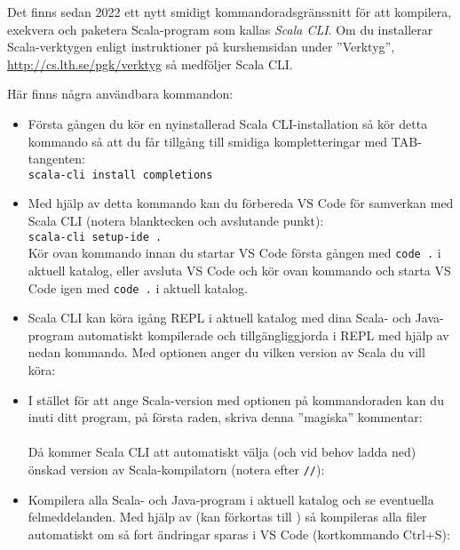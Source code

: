 Det finns sedan 2022 ett nytt smidigt kommandoradsgränssnitt  för att kompilera, exekvera och paketera Scala-program som kallas \emph{Scala CLI}. Om du installerar Scala-verktygen enligt instruktioner på kurshemsidan under ''Verktyg'', \url{http://cs.lth.se/pgk/verktyg} så medföljer Scala CLI. 

Här finns några användbara kommandon:
\begin{itemize}
\item Första gången du kör en nyinstallerad Scala CLI-installation så kör detta kommando så att du får tillgång till smidiga kompletteringar med TAB-tangenten:\\
\texttt{scala-cli install completions}

\item Med hjälp av detta kommando kan du förbereda VS Code för samverkan med Scala CLI (notera blanktecken och avslutande punkt):\\ 
\texttt{scala-cli setup-ide .}\\
Kör ovan kommando innan du startar VS Code första gången med \texttt{code .} i aktuell katalog, eller avsluta VS Code och kör ovan kommando och starta VS Code igen med \texttt{code .}  i aktuell katalog.


\item Scala CLI kan köra igång REPL i aktuell katalog med dina Scala- och Java-program automatiskt kompilerade och tillgängliggjorda i REPL med hjälp av nedan kommando. Med optionen  anger du vilken version av Scala du vill köra:\\

\item I stället för att ange Scala-version med optionen  på kommandoraden kan du inuti ditt program, på första raden, skriva denna ''magiska'' kommentar:\\ 
 \\
Då kommer Scala CLI att automatiskt välja (och vid behov ladda ned) önskad version av Scala-kompilatorn (notera \code{>} efter \texttt{//}):

\item Kompilera alla Scala- och Java-program i aktuell katalog och se eventuella felmeddelanden. Med hjälp av  (kan förkortas till ) så kompileras alla filer automatiskt om så fort ändringar sparas i VS Code (kortkommando Ctrl+S):\\


\end{itemize}
